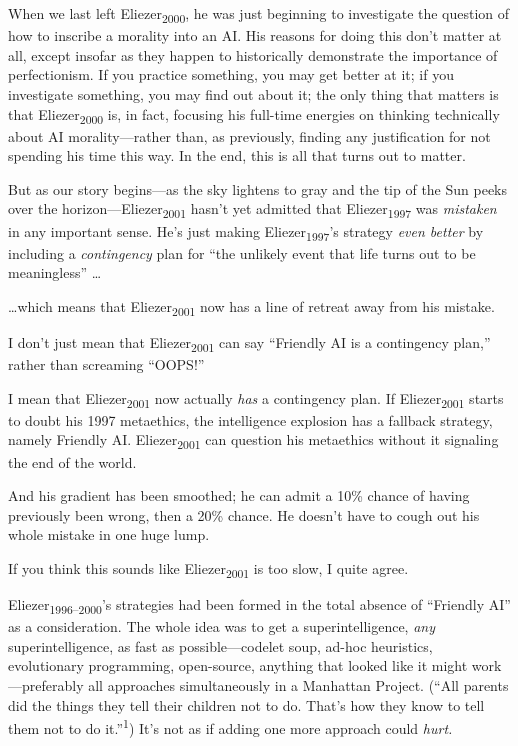 
{
 When we last left Eliezer\textsubscript{2000}, he was just
beginning to investigate the question of how to inscribe a morality
into an AI. His reasons for doing this don't matter at
all, except insofar as they happen to historically demonstrate the
importance of perfectionism. If you practice something, you may get
better at it; if you investigate something, you may find out about it;
the only thing that matters is that Eliezer\textsubscript{2000} is, in
fact, focusing his full-time energies on thinking technically about AI
morality---rather than, as previously, finding any justification for
not spending his time this way. In the end, this is all that turns out
to matter. }

{
 But as our story begins---as the sky lightens to gray and the tip
of the Sun peeks over the horizon---Eliezer\textsubscript{2001}
hasn't yet admitted that Eliezer\textsubscript{1997}
was \textit{mistaken} in any important sense. He's just
making Eliezer\textsubscript{1997}'s strategy
\textit{even better} by including a \textit{contingency} plan for
``the unlikely event that life turns out to be
meaningless'' \ldots}

{
 \ldots which means that Eliezer\textsubscript{2001} now has a line
of retreat away from his mistake.}

{
 I don't just mean that Eliezer\textsubscript{2001}
can say ``Friendly AI is a contingency
plan,'' rather than screaming
``OOPS!''}

{
 I mean that Eliezer\textsubscript{2001} now actually \textit{has}
a contingency plan. If Eliezer\textsubscript{2001} starts to doubt his
1997 metaethics, the intelligence explosion has a fallback strategy,
namely Friendly AI. Eliezer\textsubscript{2001} can question his
metaethics without it signaling the end of the world.}

{
 And his gradient has been smoothed; he can admit a 10\% chance of
having previously been wrong, then a 20\% chance. He
doesn't have to cough out his whole mistake in one huge
lump.}

{
 If you think this sounds like Eliezer\textsubscript{2001} is too
slow, I quite agree.}

{
 Eliezer\textsubscript{1996--2000}'s strategies had
been formed in the total absence of ``Friendly
AI'' as a consideration. The whole idea was to get a
superintelligence, \textit{any} superintelligence, as fast as
possible---codelet soup, ad-hoc heuristics, evolutionary programming,
open-source, anything that looked like it might work---preferably all
approaches simultaneously in a Manhattan Project.
(``All parents did the things they tell their children
not to do. That's how they know to tell them not to do
it.''\textsuperscript{1}) It's not as
if adding one more approach could \textit{hurt.}}

